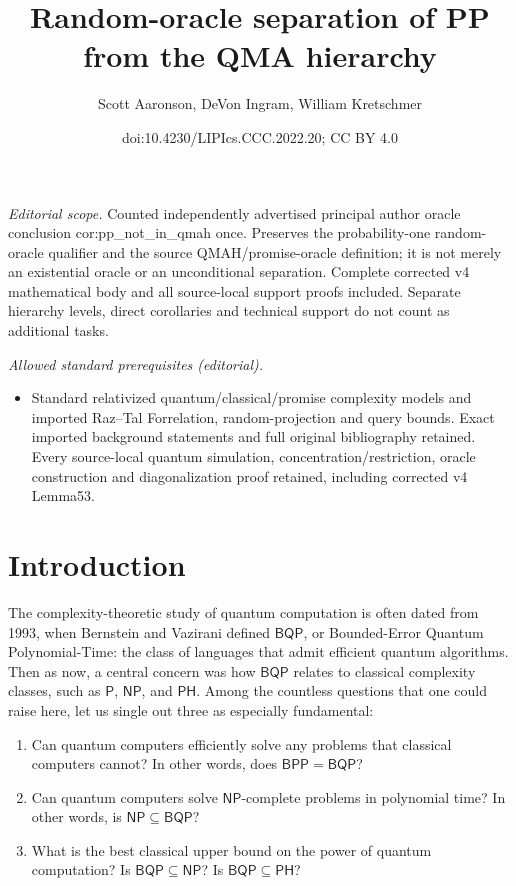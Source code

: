 \documentclass[10pt,a4paper]{article}
\title{Random-oracle separation of PP from the QMA hierarchy}
\author{Scott Aaronson, DeVon Ingram, William Kretschmer}
\date{doi:10.4230/LIPIcs.CCC.2022.20; CC BY 4.0}
\begin{document}
\maketitle
\noindent\textit{Editorial scope.} Counted independently advertised principal author oracle conclusion cor:pp\_not\_in\_qmah once. Preserves the probability-one random-oracle qualifier and the source QMAH/promise-oracle definition; it is not merely an existential oracle or an unconditional separation. Complete corrected v4 mathematical body and all source-local support proofs included. Separate hierarchy levels, direct corollaries and technical support do not count as additional tasks.\par\medskip
\noindent\textit{Allowed standard prerequisites (editorial).}\begin{itemize}
\item Standard relativized quantum/classical/promise complexity models and imported Raz–Tal Forrelation, random-projection and query bounds. Exact imported background statements and full original bibliography retained. Every source-local quantum simulation, concentration/restriction, oracle construction and diagonalization proof retained, including corrected v4 Lemma53.
\end{itemize}\medskip
\section{Introduction\label{INTRO}}

The complexity-theoretic study of quantum computation is often dated from 1993, when Bernstein and Vazirani \cite{BV97} defined $\mathsf{BQP}$, or Bounded-Error Quantum Polynomial-Time: the class of languages that admit efficient quantum algorithms.  Then as now, a central concern was how $\mathsf{BQP}$ relates to classical complexity classes, such as $\mathsf{P}$, $\mathsf{NP}$, and $\mathsf{PH}$.  Among the countless questions that one could raise here, let us single out three as especially fundamental:
\begin{enumerate}[(1)]
\item Can quantum computers efficiently solve any problems that classical computers cannot?  In other words, does $\mathsf{BPP}= \mathsf{BQP}$?
\item Can quantum computers solve $\mathsf{NP}$-complete problems in polynomial time?  In other words, is $\mathsf{NP} \subseteq \mathsf{BQP}$?
\item What is the best classical upper bound on the power of quantum computation?  Is $\mathsf{BQP} \subseteq \mathsf{NP}$?  Is $\mathsf{BQP} \subseteq \mathsf{PH}$?
\end{enumerate}
\end{document}
